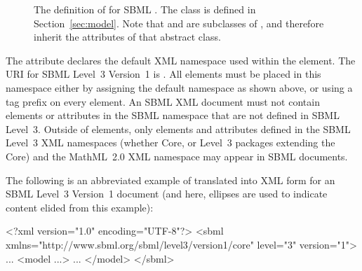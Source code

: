 \begin{figure}[htb]
  \centering
  \small
  \caption{The definition of \Sbml for SBML \thisLV.  The class
    \Model is defined in Section~\ref{sec:model}.  Note that \Sbml
    and \Model are subclasses of \SBase, and therefore inherit
    the attributes of that abstract class.}
  \label{fig:sbml}
\end{figure}

The attribute  declares the default XML namespace
used within the  element.  The URI for SBML Level~3
Version~1 is .
All elements must be placed in this namespace either by assigning
the default namespace as shown above, or using a tag prefix on
every element.  An SBML XML document must not contain elements or
attributes in the SBML namespace that are not defined in SBML
Level~3.  Outside of  elements, only elements
and attributes defined in the SBML Level~3 XML namespaces (whether
Core, or Level~3 packages extending the Core) and the MathML~2.0
XML namespace may appear in SBML documents.

The following is an abbreviated example of \Sbml translated into
XML form for an SBML Level~3 Version~1 document (and here,
ellipses are used to indicate content elided from this example):

\begin{example}
<?xml version="1.0" encoding="UTF-8"?>
<sbml xmlns="http://www.sbml.org/sbml/level3/version1/core" level="3" version="1">
  ...
  <model ...>
     ...
  </model>
</sbml>
\end{example}

